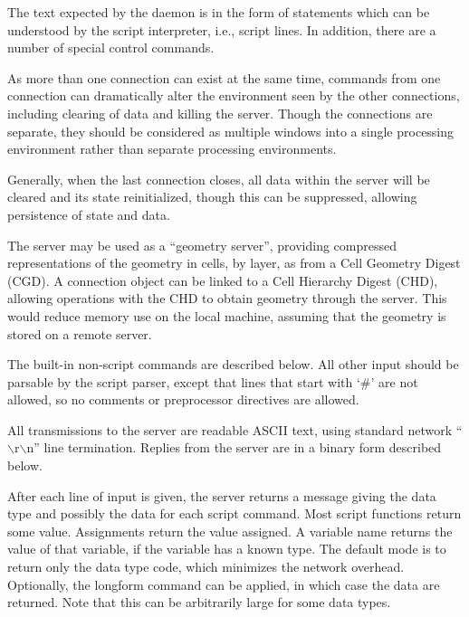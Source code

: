 The text expected by the daemon is in the form of statements which can
be understood by the script interpreter, i.e., script lines.  In
addition, there are a number of special control commands.

As more than one connection can exist at the same time, commands from
one connection can dramatically alter the environment seen by the
other connections, including clearing of data and killing the server. 
Though the connections are separate, they should be considered as
multiple windows into a single processing environment rather than
separate processing environments.

Generally, when the last connection closes, all data within the server
will be cleared and its state reinitialized, though this can be
suppressed, allowing persistence of state and data.

The server may be used as a ``geometry server'', providing compressed
representations of the geometry in cells, by layer, as from a Cell
Geometry Digest (CGD).  A connection object can be linked to a Cell
Hierarchy Digest (CHD), allowing operations with the CHD to obtain
geometry through the server.  This would reduce memory use on the
local machine, assuming that the geometry is stored on a remote
server.

The built-in non-script commands are described below.  All other input
should be parsable by the script parser, except that lines that start
with `\#' are not allowed, so no comments or preprocessor directives
are allowed.

All transmissions to the server are readable ASCII text, using
standard network ``{\vt $\backslash$r$\backslash$n}'' line
termination.  Replies from the server are in a binary form described
below.

After each line of input is given, the server returns a message giving
the data type and possibly the data for each script command.  Most
script functions return some value.  Assignments return the value
assigned.  A variable name returns the value of that variable, if the
variable has a known type.  The default mode is to return only the
data type code, which minimizes the network overhead.  Optionally, the
{\vt longform} command can be applied, in which case the data are
returned.  Note that this can be arbitrarily large for some data
types.

